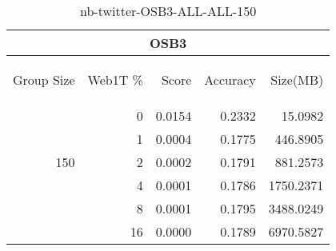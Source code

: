 \begin{center}
\begin{table}[htbp]
\begin{tabular}{ | r | r | r | r | r |}
\hline
\multicolumn{5}{|c|}{OSB3}\\
\hline
\begin{sideways}Group Size\end{sideways} & \begin{sideways}Web1T \%\end{sideways} & \begin{sideways}Score\end{sideways} & \begin{sideways}Accuracy\end{sideways} & \begin{sideways}Size(MB)\end{sideways}\\
\hline
\multirow{5}{*}{150}
 & 0 & 0.0154 & 0.2332 & 15.0982\\ \cline{2-5}
 & 1 & 0.0004 & 0.1775 & 446.8905\\ \cline{2-5}
 & 2 & 0.0002 & 0.1791 & 881.2573\\ \cline{2-5}
 & 4 & 0.0001 & 0.1786 & 1750.2371\\ \cline{2-5}
 & 8 & 0.0001 & 0.1795 & 3488.0249\\ \cline{2-5}
 & 16 & 0.0000 & 0.1789 & 6970.5827\\ \cline{2-5}
\hline
\end{tabular}
\caption{nb-twitter-OSB3-ALL-ALL-150}
\label{table:nb-twitter-OSB3-ALL-ALL-150}
\end{table}
\end{center}

